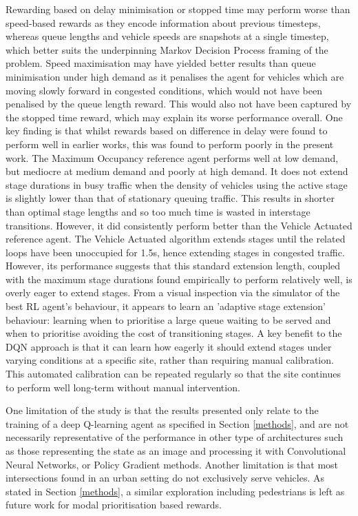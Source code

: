 \documentclass[conference]{IEEEtran}
\begin{document}
Rewarding based on delay minimisation or stopped time may perform worse than speed-based rewards as they encode information about previous timesteps, whereas queue lengths and vehicle speeds are snapshots at a single timestep, which better suits the underpinning Markov Decision Process framing of the problem.
Speed maximisation may have yielded better results than queue minimisation under high demand as it penalises the agent for vehicles which are moving slowly forward in congested conditions, which would not have been penalised by the queue length reward.
This would also not have been captured by the stopped time reward, which may explain its worse performance overall. One key finding is that whilst rewards based on difference in delay were found to perform well in earlier works, this was found to perform poorly in the present work.
The Maximum Occupancy reference agent performs well at low demand, but mediocre at medium demand and poorly at high demand.
It does not extend stage durations in busy traffic when the density of vehicles using the active stage is slightly lower than that of stationary queuing traffic.
This results in shorter than optimal stage lengths and so too much time is wasted in interstage transitions.
However, it did consistently perform better than the Vehicle Actuated reference agent.
The Vehicle Actuated algorithm extends stages until the related loops have been unoccupied for 1.5s, hence extending stages in congested traffic.
However, its performance suggests that this standard extension length, coupled with the maximum stage durations found empirically to perform relatively well, is overly eager to extend stages.
From a visual inspection via the simulator of the best RL agent's behaviour, it appears to learn an 'adaptive stage extension' behaviour: learning when to prioritise a large queue waiting to be served and when to prioritise avoiding the cost of transitioning stages.
A key benefit to the DQN approach is that it can learn how eagerly it should extend stages under varying conditions at a specific site, rather than requiring manual calibration.
This automated calibration can be repeated regularly so that the site continues to perform well long-term without manual intervention.

One limitation of the study is that the results presented only relate to the training of a deep Q-learning agent as specified in Section \ref{methods}, and are not necessarily representative of the performance in other type of architectures such as those representing the state as an image and processing it with Convolutional Neural Networks, or Policy Gradient methods.
Another limitation is that most intersections found in an urban setting do not exclusively serve vehicles. As stated in Section \ref{methods}, a similar exploration including pedestrians is left as future work for modal prioritisation based rewards.
\end{document}
